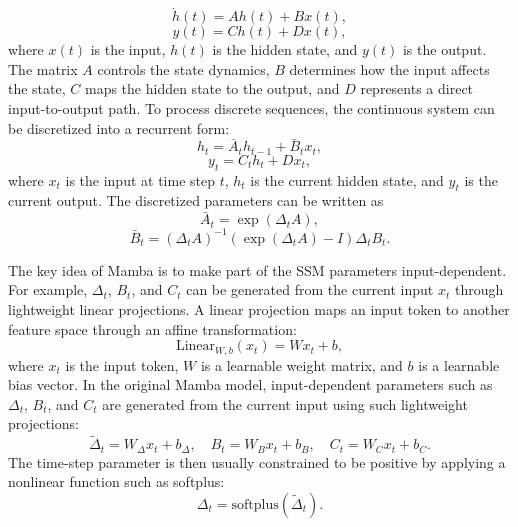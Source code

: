 \documentclass[11pt,twoside]{eitExjobb}
\begin{document}
\begin{equation}
\dot{h}(t)=Ah(t)+Bx(t),
\end{equation}
\begin{equation}
y(t)=Ch(t)+Dx(t),
\end{equation}
where $x(t)$ is the input, $h(t)$ is the hidden state, and $y(t)$ is the output. The
matrix $A$ controls the state dynamics, $B$ determines how the input affects the state,
$C$ maps the hidden state to the output, and $D$ represents a direct input-to-output
path. To process discrete sequences, the continuous system can be discretized into a
recurrent form:
\begin{equation}
h_t=\bar{A}_t h_{t-1}+\bar{B}_t x_t,
\end{equation}
\begin{equation}
y_t=C_t h_t+D x_t,
\end{equation}
where $x_t$ is the input at time step $t$, $h_t$ is the current hidden state, and $y_t$
is the current output. The discretized parameters can be written as
\begin{equation}
\bar{A}_t=\exp(\Delta_t A),
\end{equation}
\begin{equation}
\bar{B}_t=(\Delta_t A)^{-1}\left(\exp(\Delta_t A)-I\right)\Delta_t B_t.
\end{equation}

The key idea of Mamba is to make part of the SSM parameters input-dependent. For
example, $\Delta_t$, $B_t$, and $C_t$ can be generated from the current input $x_t$
through lightweight linear projections. A linear projection maps an input token to another feature space through an
affine transformation:
\begin{equation}
\mathrm{Linear}_{W,b}(x_t) = W x_t + b,
\label{eq:linear_projection_general}
\end{equation}
where $x_t$ is the input token, $W$ is a learnable weight matrix, and $b$ is a
learnable bias vector. In the original Mamba model, input-dependent parameters
such as $\Delta_t$, $B_t$, and $C_t$ are generated from the current input using
such lightweight projections:
\begin{equation}
\tilde{\Delta}_t = W_{\Delta}x_t + b_{\Delta}, \quad
B_t = W_B x_t + b_B, \quad
C_t = W_C x_t + b_C .
\label{eq:mamba_input_dependent_projection}
\end{equation}
The time-step parameter is then usually constrained to be positive by applying a
nonlinear function such as softplus:
\begin{equation}
\Delta_t = \mathrm{softplus}(\tilde{\Delta}_t).
\label{eq:mamba_delta_softplus}
\end{equation}
\end{document}
